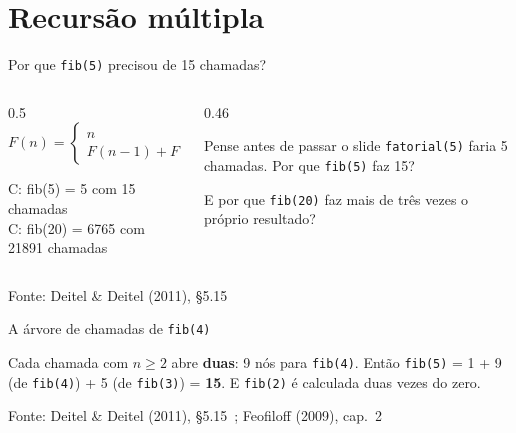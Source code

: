 \documentclass[aspectratio=169]{beamer}
\newcommand{\fonte}[1]{\vfill\hfill{\scriptsize\textcolor{UFSGray}{Fonte: #1}}}
\begin{document}
\section{Recursão múltipla}

\begin{frame}{Por que \texttt{fib(5)} precisou de 15 chamadas?}
  \begin{columns}[c]
    \begin{column}{0.5\textwidth}
      \small
      \[
        F(n) =
        \begin{cases}
          n & \text{se } n < 2\\
          F(n-1) + F(n-2) & \text{se } n \ge 2
        \end{cases}
      \]
      \begin{center}
        \scriptsize\ttfamily
        C: fib(5) = 5 com 15 chamadas\\
        C: fib(20) = 6765 com 21891 chamadas
      \end{center}
    \end{column}
    \begin{column}{0.46\textwidth}
      \begin{block}{Pense antes de passar o slide}
        \small \texttt{fatorial(5)} faria 5 chamadas. Por que
        \texttt{fib(5)} faz 15?

        \medskip
        E por que \texttt{fib(20)} faz mais de três vezes o próprio
        resultado?
      \end{block}
    \end{column}
  \end{columns}
  \fonte{Deitel \& Deitel (2011), §5.15~\cite{deitel2011como}}
\end{frame}

\begin{frame}{A árvore de chamadas de \texttt{fib(4)}}
  \begin{center}
  \end{center}
  \begin{block}{}
    \small Cada chamada com $n \ge 2$ abre \textbf{duas}: 9 nós para
    \texttt{fib(4)}. Então \texttt{fib(5)} = 1 + 9 (de \texttt{fib(4)}) +
    5 (de \texttt{fib(3)}) = \textbf{15}. E \textcolor{UFSRed}{\texttt{fib(2)}
    é calculada duas vezes} do zero.
  \end{block}
  \fonte{Deitel \& Deitel (2011), §5.15~\cite{deitel2011como};
    Feofiloff (2009), cap.~2~\cite{feofiloff2009algoritmos}}
\end{frame}
\end{document}
